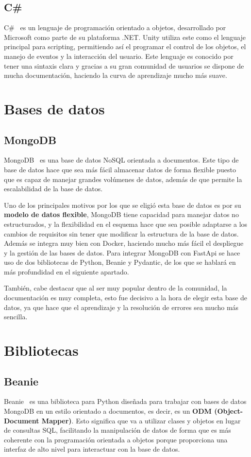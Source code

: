 \subsection{C\#}
C\#~\cite{csharp} es un lenguaje de programación orientado a objetos, desarrollado por Microsoft como parte de su plataforma .NET. Unity utiliza este como el lenguaje principal para scripting, permitiendo así el programar el control de los objetos, el manejo de eventos y la interacción del usuario.
Este lenguaje es conocido por tener una sintaxis clara y gracias a su gran comunidad de usuarios se dispone de mucha documentación, haciendo la curva de aprendizaje mucho más suave.


\section{Bases de datos}

\subsection{MongoDB}
MongoDB~\cite{mongodb} es una base de datos NoSQL orientada a documentos. Este tipo de base de datos hace que sea más fácil almacenar datos de forma flexible puesto que es capaz de manejar grandes volúmenes de datos, además de que permite la escalabilidad de la base de datos.

Uno de los principales motivos por los que se eligió esta base de datos es por su \textbf{modelo de datos flexible}, MongoDB tiene capacidad para manejar datos no estructurados, y la flexibilidad en el esquema hace que sea posible adaptarse a los cambios de requisitos sin tener que modificar la estructura de la base de datos. Además se integra muy bien con Docker, haciendo mucho más fácil el despliegue y la gestión de las bases de datos. Para integrar MongoDB con FastApi se hace uso de dos bibliotecas de Python, Beanie y Pydantic, de los que se hablará en más profundidad en el siguiente apartado.

También, cabe destacar que al  ser muy popular dentro de la comunidad, la documentación es muy completa, esto fue decisivo a la hora de elegir esta base de datos, ya que hace que el aprendizaje y la resolución de errores sea mucho más sencilla.

\section{Bibliotecas}

\subsection{Beanie}
Beanie~\cite{beanie} es una biblioteca para Python diseñada para trabajar con bases de datos MongoDB en un estilo orientado a documentos, es decir, es un \textbf{ODM (Object-Document Mapper)}. Esto significa que va a utilizar clases y objetos en lugar de consultas SQL, facilitando la manipulación de datos de forma que es más coherente con la programación orientada a objetos porque proporciona una interfaz de alto nivel para interactuar con la base de datos. 


